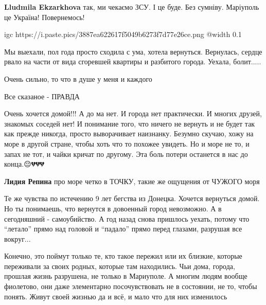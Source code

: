 \textbf{Lludmila Ekzarkhova} так, ми чекаємо ЗСУ. І це буде. Без сумніву. Маріуполь це Україна! Повернемось!


\ifcmt
  igc https://i.paste.pics/3887ea622617f5049b6273f7d77e26ce.png
  @width 0.1
\fi


Мы выехали, пол года просто сходила с ума, хотела вернуться. Вернулась, сердце
рвало на части от вида сгоревшей квартиры и разбитого города. Уехала, болит.....


Очень сильно, то что в душе у меня и каждого


Все сказаное - ПРАВДА


Очень хочется домой!!! А до ма нет. И города нет практически. И многих
друзей, знакомых соседей нет! И понимание того, что ничего не вернуть и не будет
так как прежде никогда, просто выворачивает наизнанку. Безумно скучаю, хожу на
море в другой стране, чтобы хоть что то похожее увидеть. Но и море не то, и запах
не тот, и чайки кричат по другому. Эта боль потери останется в нас до
конца.😔💔💔💔

\begin{itemize} %
\textbf{Лидия Репина} про море четко в ТОЧКУ, такие же ощущения от ЧУЖОГО моря
\end{itemize} %


Те же чувства по истечению 9 лет бегства из Донецка. Хочется вернуться домой.
Но ты понимаешь, что вернутся в довоенный город невозможно. А в сегодняшний -
самоубийство. А год назад снова пришлось уехать, потому что \enquote{летало} прямо над
головой и \enquote{падало} прямо перед глазами, разрушая все вокруг...


Конечно, это поймут только те, кто такое пережил или их близкие, которые
переживали за своих родных, которые там находились. Чьи дома, города, прошлая
жизнь разрушена, не только в Мариуполе. А многим людям вообще фиолетово, они
даже элементарно посочувствовать не в состоянии, не то, чтобы понять. Живут
своей жизнью да и всё, и мало что для них изменилось



